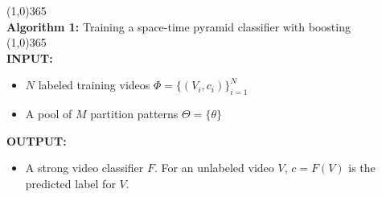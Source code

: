   \footnotesize
  \hspace*{-0.19in}\line(1,0){365}\\
  \noindent\textbf{Algorithm 1:} Training a space-time pyramid classifier with boosting \\
  \line(1,0){365}\\
  \textbf{\scriptsize INPUT:}
  \begin{itemize}
    \item $N$ labeled training videos $\Phi = \{(V_i, c_i)\}_{i=1}^N$
    \item A pool of $M$ partition patterns $\Theta = \{\theta\}$
  \end{itemize}
  \textbf{\scriptsize OUTPUT:}
  \begin{itemize}
    \item A strong video classifier $F$. For an unlabeled video $V$,
      $c=F(V)$ is the predicted label for $V$.
  \end{itemize}
